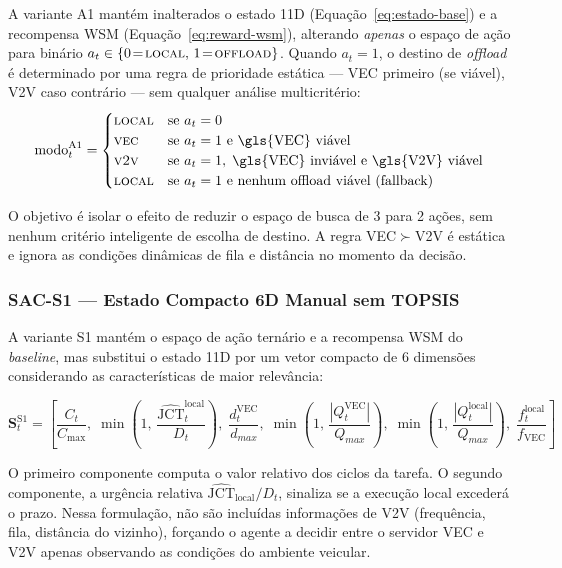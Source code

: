 A variante A1 mantém inalterados o estado 11D (Equação~\ref{eq:estado-base}) e a recompensa WSM (Equação~\ref{eq:reward-wsm}), alterando \emph{apenas} o espaço de ação para binário $a_t \in \{0\!=\!\textsc{local},\, 1\!=\!\textsc{offload}\}$. Quando $a_t = 1$, o destino de \textit{offload} é determinado por uma regra de prioridade estática — \gls{VEC} primeiro (se viável), \gls{V2V} caso contrário — sem qualquer análise multicritério:
\begin{equation}
    \text{modo}^{\text{A1}}_t =
    \begin{cases}
        \textsc{local} & \text{se } a_t = 0 \\
        \textsc{vec}   & \text{se } a_t = 1 \text{ e \gls{VEC} viável} \\
        \textsc{v2v}   & \text{se } a_t = 1,\; \text{\gls{VEC} inviável e \gls{V2V} viável} \\
        \textsc{local} & \text{se } a_t = 1 \text{ e nenhum offload viável (fallback)}
    \end{cases}
    \label{eq:acao-a1}
\end{equation}

O objetivo é isolar o efeito de reduzir o espaço de busca de 3 para 2 ações, sem nenhum critério inteligente de escolha de destino. A regra \gls{VEC}$\succ$\gls{V2V} é estática e ignora as condições dinâmicas de fila e distância no momento da decisão.

\subsubsection*{SAC-S1 — Estado Compacto 6D Manual sem TOPSIS}

A variante S1 mantém o espaço de ação ternário e a recompensa \gls{WSM} do \textit{baseline}, mas substitui o estado 11D por um vetor compacto de 6 dimensões considerando as características de maior relevância:

\begin{equation}
    \mathbf{S}^{\text{S1}}_t = \left[
        \frac{C_t}{C_{\max}},\;
        \min\!\left(1,\, \frac{\widehat{\text{JCT}}^{\text{local}}_t}{D_t}\right),\;
        \frac{d^{\text{VEC}}_t}{d_{max}},\;
        \min\!\left(1,\, \frac{|Q^{\text{VEC}}_t|}{Q_{max}}\right),\;
        \min\!\left(1,\, \frac{|Q^{\text{local}}_t|}{Q_{max}}\right),\;
        \frac{f^{\text{local}}_t}{f_{\text{VEC}}}
    \right]
    \label{eq:estado-s1}
\end{equation}

O primeiro componente computa o valor relativo dos ciclos da tarefa. O segundo componente, a urgência relativa $\widehat{\text{JCT}}_{\text{local}}/D_t$, sinaliza se a execução local excederá o prazo. Nessa formulação, não são incluídas informações de \gls{V2V} (frequência, fila, distância do vizinho), forçando o agente a decidir entre o servidor \gls{VEC} e \gls{V2V} apenas observando as condições do ambiente veicular.

